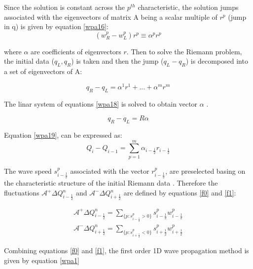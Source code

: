 \documentclass[12pt,a4paper]{article}
\begin{document}
	\noindent Since the solution is constant across the $p^{th}$ characteristic, the solution jumps associated with the eigenvectors of matrix A being a scalar multiple of $r^{p}$ (jump in q) is given by equation \eqref{wpa16}:
	\begin{equation}
		(w_{R}^{p} - w_{L}^{p}) r^{p} \equiv \alpha^{p}r^{p}
		\label{wpa16}
	\end{equation}

	\noindent where $\alpha$ are coefficients of eigenvectors $r$. Then to solve the Riemann problem, the initial data ($q_{L},q_{R}$) is taken and then the jump ($q_{L} - q_{R}$) is decomposed into a set of  eigenvectors of A:
	
	\begin{equation}
		q_{R} - q_{L} = \alpha^{1}r^{1} + ... + \alpha^{m}r^{m}
		\label{wpa17}
	\end{equation}
	
	\noindent The linar system of equations \eqref{wpa18}  is solved to obtain vector $\alpha$ .
	
		\begin{equation}
		q_{R} - q_{L} = R \alpha
		\label{wpa18}
	\end{equation}
	
	\noindent Equation \eqref{wpa19}, can be expressed as:
		\begin{equation}
		Q_{i} -  Q_{i-1} = \sum_{p=1}^{m}  \alpha_{i-\frac{1}{2}} r_{i-\frac{1}{2}}
		\label{wpa19}
	\end{equation}

	\noindent The wave speed $s_{i-\frac{1}{2}}^{p}$ associated with the vector $r_{i-\frac{1}{2}}^{p}$, are preselected basing on the characteristic structure of the initial Riemann data \cite{ge:2008}. Therefore the fluctuations $\mathcal{A^{+}}\Delta Q_{i-\frac{1}{2}}^{n}$  and $\mathcal{A^{-}}\Delta Q_{i+\frac{1}{2}}^{n} $ are defined by equations \eqref{f0} and \eqref{f1}:
   
   \begin{eqnarray}
   	\mathcal{A^{+}}\Delta Q_{i-\frac{1}{2}}^{n} = \sum_{\{ p:s_{i-\frac{1}{2}}^{p}>0\}} s_{i-\frac{1}{2}}^{p} w_{i-\frac{1}{2}}^{p}
   	\label{f0}\\
   		\mathcal{A^{-}}\Delta Q_{i+\frac{1}{2}}^{n} = \sum_{\{ p:s_{i+\frac{1}{2}}^{p}<0\}} s_{i+\frac{1}{2}}^{p} w_{i+\frac{1}{2}}^{p}
   		\label{f1}
   \end{eqnarray}
   
   
   \noindent Combining equations \eqref{f0} and \eqref{f1}, the  first order 1D  wave propagation method is given by equation \eqref{wpa1}
	
\end{document}
